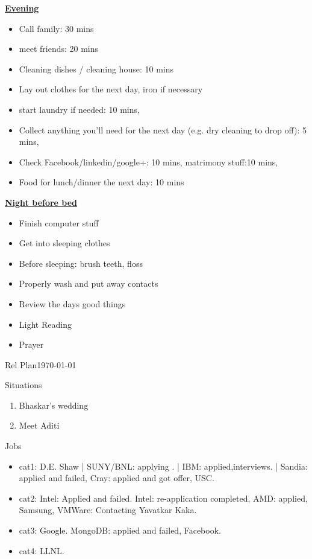 \underline{\bf Evening}
\begin{itemize}
\tiny \item \tiny Call family: 30 mins
\item \tiny meet friends: 20 mins
\item \tiny Cleaning dishes / cleaning house: 10 mins
\item \tiny Lay out clothes for the next day, iron if necessary
\item \tiny start laundry if needed: 10 mins,
\item \tiny Collect anything you’ll need for the next day (e.g. dry
cleaning to drop off): 5 mins,
\item \tiny Check Facebook/linkedin/google+: 10 mins, matrimony stuff:10 mins,
\item \tiny Food for lunch/dinner the next day: 10 mins
\end{itemize}
\underline{\bf Night before bed}
\begin{itemize}
\tiny \item \tiny Finish computer stuff 
\item \tiny Get into sleeping clothes 
\item \tiny Before sleeping: brush teeth, floss  
\item \tiny Properly wash and put away contacts 
\item \tiny Review the days good things  
\item \tiny Light Reading 
\item \tiny Prayer 
\end{itemize}
\begin{frame}{Rel Plan}{\today}
\end{frame}
\begin{frame}{Situations}


\begin{enumerate}

\item Bhaskar's wedding
\item Meet Aditi 


\end{enumerate}

\end{frame}
\begin{block}{Jobs}
  \begin{itemize}
    \tiny \item \tiny cat1: D.E. Shaw | SUNY/BNL: applying . | IBM:
    applied,interviews.  | Sandia: applied and failed, Cray: applied and got offer, USC. 
  \item \tiny cat2: Intel: Applied and failed. Intel: re-application  completed, AMD: applied, Samsung, VMWare: Contacting Yavatkar Kaka. 
  \item \tiny cat3: Google. MongoDB: applied and failed, Facebook. 
  \item \tiny cat4: LLNL. 
  \end{itemize} 
\end{block} 

